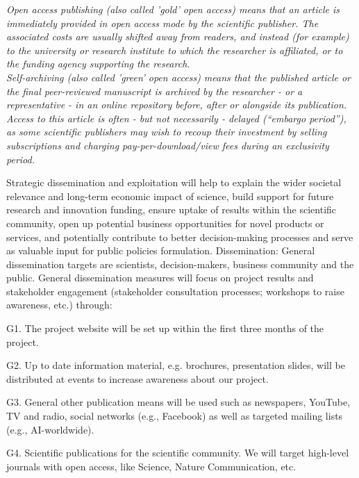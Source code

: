 \documentclass[11pt, a4paper]{article} %
\begin{document}
{\begin{itemize}
\begin{itemize}
\end{itemize} 
\emph{Open access publishing (also called 'gold' open access) means that an article is immediately provided in open access mode by the scientific publisher. The associated costs are usually shifted away from readers, and instead (for example) to the university or research institute to which the researcher is affiliated, or to the funding agency supporting the research.}\\
\emph{Self-archiving (also called 'green' open access) means that the
  published article or the final peer-reviewed manuscript is archived
  by the researcher - or a representative - in an online repository
  before, after or alongside its publication. Access to this article
  is often - but not necessarily - delayed (``embargo period''), as
  some scientific publishers may wish to recoup their investment by
  selling subscriptions and charging pay-per-download/view fees during
  an exclusivity period.}
\end{itemize}
}

Strategic dissemination and exploitation will help to explain the
wider societal relevance and long-term economic impact of science,
build support for future research and innovation funding, ensure
uptake of results within the scientific community, open up potential
business opportunities for novel products or services, and potentially
contribute to better decision-making processes and serve as valuable
input for public policies formulation.  Dissemination: General
dissemination targets are scientists, decision-makers, business
community and the public.  General dissemination measures will focus
on project results and stakeholder engagement (stakeholder
consultation processes; workshops to raise awareness, etc.) through:

G1. The project website will be set up within the first three months
of the project.

G2. Up to date information material, e.g. brochures, presentation
slides, will be distributed at events to increase awareness about our
project.

G3. General other publication means will be used such as newspapers,
YouTube, TV and radio, social networks (e.g., Facebook) as well as
targeted mailing lists (e.g., AI-worldwide).

G4. Scientific publications for the scientific community. We will
target high-level journals with open access, like Science, Nature
Communication, etc.
\end{document}
